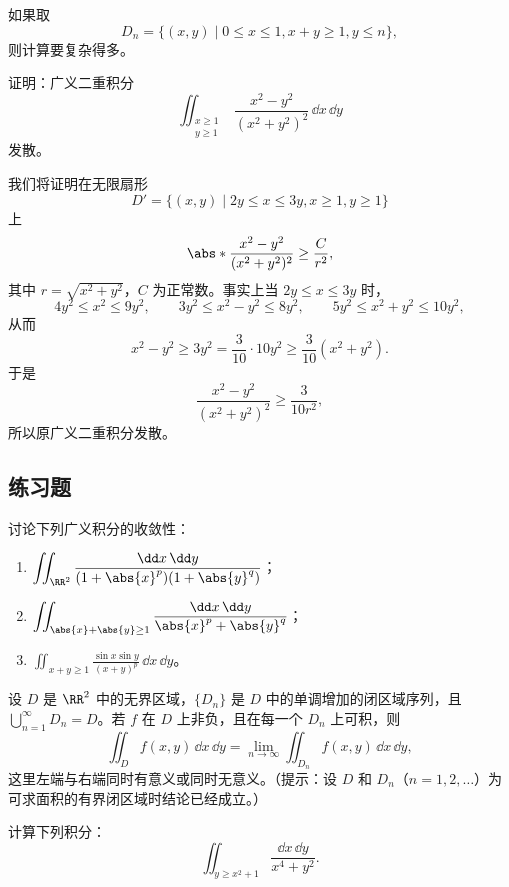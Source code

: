\begin{xremark}
如果取
\[
  D_n=\{(x,y)\mid0\le x\le1,x+y\ge1,y\le n\},
\]
则计算要复杂得多。
\end{xremark}

\begin{xexample}[22.4.3]
证明：广义二重积分
\[
  \iint_{\substack{x\ge1\\y\ge1}}\frac{x^2-y^2}{(x^2+y^2)^2}\,\dd x\,\dd y
\]
发散。
\end{xexample}
\begin{xproof}
我们将证明在无限扇形
\[
  D'=\{(x,y)\mid2y\le x\le3y,x\ge1,y\ge1\}
\]
上
\[
  \abs*{\frac{x^2-y^2}{(x^2+y^2)^2}}\ge\frac C{r^2},
\]
其中 $r=\sqrt{x^2+y^2}$，$C$ 为正常数。事实上当 $2y\le x\le3y$ 时，
\[
  4y^2\le x^2\le9y^2,\qquad3y^2\le x^2-y^2\le8y^2,\qquad5y^2\le x^2+y^2\le10y^2,
\]
从而
\[
  x^2-y^2\ge3y^2=\frac3{10}\cdot10y^2\ge\frac3{10}(x^2+y^2).
\]
于是
\[
  \frac{x^2-y^2}{(x^2+y^2)^2}\ge\frac3{10r^2},
\]
所以原广义二重积分发散。
\end{xproof}

\subsection{练习题}

\begin{xexercise}[1]
讨论下列广义积分的收敛性：
  \begin{enumerate}[label=(\arabic*)]
    \item $\displaystyle\iint_{\RR^2}\frac{\dd x\,\dd y}{(1+\abs{x}^p)(1+\abs{y}^q)}$；
    \item $\displaystyle\iint_{\abs{x}+\abs{y}\ge1}\frac{\dd x\,\dd y}{\abs{x}^p+\abs{y}^q}$；
    \item $\displaystyle\iint_{x+y\ge1}\frac{\sin x\sin y}{(x+y)^p}\,\dd x\,\dd y$。
  \end{enumerate}
\end{xexercise}

\begin{xexercise}[2]
设 $D$ 是 $\RR^2$ 中的无界区域，$\{D_n\}$ 是 $D$ 中的单调增加的闭区域序列，且 $\bigcup_{n=1}^{\infty}D_n=D$。若 $f$ 在 $D$ 上非负，且在每一个 $D_n$ 上可积，则
  \[
    \iint_Df(x,y)\,\dd x\,\dd y=\lim_{n\to\infty}\iint_{D_n}f(x,y)\,\dd x\,\dd y,
  \]
  这里左端与右端同时有意义或同时无意义。（提示：设 $D$ 和 $D_n$（$n=1,2,\ldots$）为可求面积的有界闭区域时结论已经成立。）
\end{xexercise}

\begin{xexercise}[3]
计算下列积分：
  \[
    \iint_{y\ge x^2+1}\frac{\dd x\,\dd y}{x^4+y^2}.
  \]
\end{xexercise}

